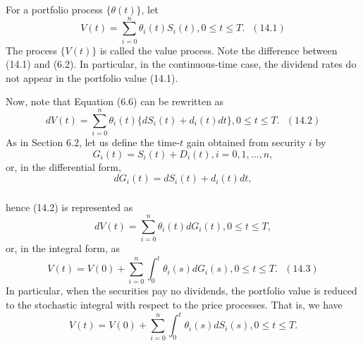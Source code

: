 \documentclass[c, dvipsnames, 8pt]{beamer}
\begin{document}
\begin{frame}[shrink=5]

\frametitle{\insertsection} 
\framesubtitle{\insertsubsection} 


For a portfolio process $\{\theta(t)\}$, let
$$V(t)=\sum_{i=0}^{n}\theta_i(t)S_i(t),0\le t\le T.\text{ }(14.1)$$
The process $\{V(t)\}$ is called the value process. Note the difference between
(14.1) and (6.2). In particular, in the continuous-time case, the dividend rates
do not appear in the portfolio value (14.1).

Now, note that Equation (6.6) can be rewritten as
$$dV(t)=\sum_{i=0}^{n}\theta_i(t)\{dS_i(t)+d_i(t)dt\},0\le t\le T.\text{ }(14.2)$$
As in Section 6.2, let us define the time-$t$ gain obtained from security $i$ by
$$G_i(t)=S_i(t)+D_i(t),i=0,1,\ldots,n,$$
or, in the differential form,
$$dG_i(t) = dS_i(t) + d_i(t)dt,$$


\end{frame}




\begin{frame}[shrink=5]

\frametitle{\insertsection} 
\framesubtitle{\insertsubsection} 

hence (14.2) is represented as
$$dV(t)=\sum_{i=0}^{n}\theta_i(t)dG_i(t),0\le t\le T,$$
or, in the integral form, as
$$V(t)=V(0)+\sum_{i=0}^{n}\int_{0}^{t}\theta_i(s)dG_i(s),0\le t\le T.\text{ }(14.3)$$
In particular, when the securities pay no dividends, the portfolio value is
reduced to the stochastic integral with respect to the price processes. That is,
we have
$$V(t)=V(0)+\sum_{i=0}^{n}\int_{0}^{t}\theta_i(s)dS_i(s),0\le t\le T.$$

\end{frame}
\end{document}

